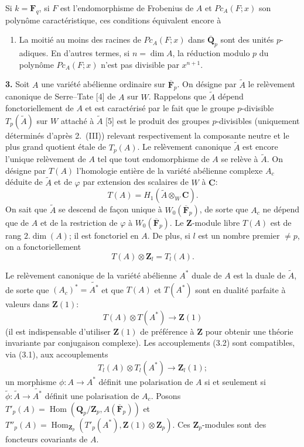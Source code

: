 \documentclass[10pt]{amsart}
\theoremstyle{plain}
\theoremstyle{remark}
\DeclareMathOperator{\Hom}{Hom}
\begin{document}
Si $k = \mathbf{F}_q$, si $F$ est l'endomorphisme de Frobenius de $A$
et $Pc_A(F;x)$ son polyn\^ome caract\'eristique, ces conditions
\'equivalent encore \`a
\begin{enumerate}
\item[(IV)] La moiti\'e au moins des racines de $Pc_A(F;x)$ dans
$\overline{\mathbf{Q}}_p$ sont des unit\'es $p$-adiques. En d'autres
termes, si $n = \dim A$, la r\'eduction modulo $p$ du polyn\^ome
$Pc_A(F;x)$ n'est pas divisible par $x^{n+1}$.
\end{enumerate}

\smallskip
\textbf{3.} Soit $A$ une vari\'et\'e ab\'elienne ordinaire sur
$\overline{\mathbf{F}}_p$. On d\'esigne par $\tilde{A}$ le rel\`evement
canonique de Serre--Tate [4] de $A$ sur $W$. Rappelons que
$\tilde{A}$ d\'epend fonctoriellement de $A$ et est caract\'eris\'e
par le fait que le groupe $p$-divisible $T_p(\tilde{A})$ sur $W$
attach\'e \`a $\tilde{A}$ [5] est le produit des groupes $p$-divisibles
(uniquement d\'etermin\'es d'apr\`es 2.~(III)) relevant respectivement
la composante neutre et le plus grand quotient \'etale de $T_p(A)$.
Le rel\`evement canonique $\tilde{A}$ est encore l'unique rel\`evement
de $A$ tel que tout endomorphisme de $A$ se rel\`eve \`a $\tilde{A}$.
On d\'esigne par $T(A)$ l'homologie enti\`ere de la vari\'et\'e
ab\'elienne complexe $A_c$ d\'eduite de $\tilde{A}$ et de $\varphi$
par extension des scalaires de $W$ \`a $\mathbf{C}$:
\[
T(A) = H_1(\tilde{A} \otimes_W \mathbf{C}).
\]
On sait que $\tilde{A}$ se descend de fa\c{c}on unique \`a
$W_0(\overline{\mathbf{F}}_p)$, de sorte que $A_c$ ne d\'epend que de
$A$ et de la restriction de $\varphi$ \`a $W_0(\overline{\mathbf{F}}_p)$.
Le $\mathbf{Z}$-module libre $T(A)$ est de rang $2.\dim(A)$; il est
fonctoriel en $A$. De plus, si $l$ est un nombre premier $\neq p$,
on a fonctoriellement
\begin{equation}
T(A) \otimes \mathbf{Z}_l = T_l(A). \tag{3.1}
\end{equation}

Le rel\`evement canonique de la vari\'et\'e ab\'elienne $A^*$ duale de
$A$ est la duale de $\tilde{A}$, de sorte que $(A_c)^* = \widetilde{A^*}$
et que $T(A)$ et $T(A^*)$ sont en dualit\'e parfaite \`a valeurs dans
$\mathbf{Z}(1)$:
\begin{equation}
T(A) \otimes T(A^*) \longrightarrow \mathbf{Z}(1) \tag{3.2}
\end{equation}
(il est indispensable d'utiliser $\mathbf{Z}(1)$ de pr\'ef\'erence \`a
$\mathbf{Z}$ pour obtenir une th\'eorie invariante par conjugaison
complexe). Les accouplements (3.2) sont compatibles, via (3.1), aux
accouplements
\[
T_l(A) \otimes T_l(A^*) \longrightarrow \mathbf{Z}_l(1);
\]
un morphisme $\phi\colon A \to A^*$ d\'efinit une polarisation de $A$
si et seulement si $\tilde{\phi}\colon \tilde{A} \to \widetilde{A^*}$
d\'efinit une polarisation de $A_c$. Posons
$T'_p(A) = \Hom(\mathbf{Q}_p/\mathbf{Z}_p, A(\overline{\mathbf{F}}_p))$
et $T''_p(A) = \Hom_{\mathbf{Z}_p}(T'_p(A^*), \mathbf{Z}(1) \otimes \mathbf{Z}_p)$.
Ces $\mathbf{Z}_p$-modules sont des foncteurs covariants de $A$.
\end{document}
